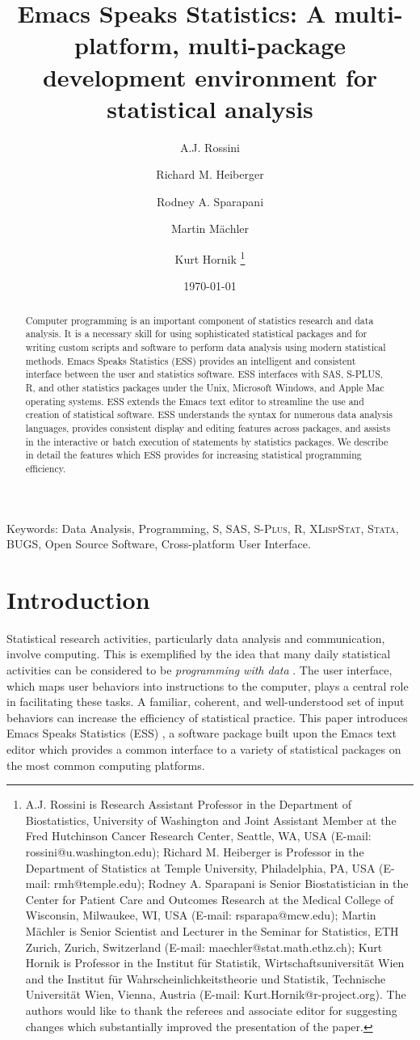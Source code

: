 \documentclass{article}
\title{Emacs Speaks Statistics: A multi-platform, multi-package
  development environment for statistical analysis}
\author{A.J. Rossini \and Richard M. Heiberger \and Rodney A. Sparapani
\and Martin M{\"a}chler \and Kurt Hornik \footnote{%
    A.J. Rossini is Research Assistant Professor in the Department of
    Biostatistics, University of Washington and Joint Assistant Member at
    the Fred Hutchinson Cancer Research Center, Seattle, WA, USA
    (E-mail: rossini@u.washington.edu);
    Richard M. Heiberger is Professor in the Department of Statistics at
    Temple University, Philadelphia, PA, USA (E-mail: rmh@temple.edu);
    Rodney A. Sparapani is Senior Biostatistician in the Center for Patient
    Care and Outcomes Research at the Medical College of Wisconsin,
    Milwaukee, WI, USA (E-mail: rsparapa@mcw.edu);
    Martin M{\"a}chler is Senior Scientist and Lecturer in the Seminar for
    Statistics, ETH Zurich, Zurich, Switzerland
    (E-mail: maechler@stat.math.ethz.ch);
    Kurt Hornik is Professor in the Institut f{\"u}r Statistik,
    Wirtschaftsuniversit{\"a}t Wien and the Institut f{\"u}r
    Wahrscheinlichkeitstheorie und Statistik, Technische
    Universit{\"a}t Wien, Vienna, Austria (E-mail:
    Kurt.Hornik@r-project.org).  The authors would like to thank the
    referees and associate editor for suggesting changes which
    substantially improved the presentation of the paper.}}
\date{\today}
\newif\ifdraft
\renewcommand{\baselinestretch}{1.5}
\newcommand*{\SAS}{\textsc{SAS}}
\newcommand*{\Splus}{\textsc{S-Plus}}
\newcommand*{\XLispStat}{\textsc{XLispStat}}
\newcommand*{\Stata}{\textsc{Stata}}
\begin{document}

\ifdraft
\setcounter{page}{0}
\tableofcontents
\fi

\maketitle

\ifdraft{}%
\else%
 \renewcommand{\baselinestretch}{1.5}
\fi

\begin{abstract}
  Computer programming is an important component of statistics
  research and data analysis.  It is a necessary skill for using
  sophisticated statistical packages and for writing custom scripts
  and software to perform data analysis using modern statistical
  methods.  Emacs Speaks Statistics (ESS) provides an intelligent and
  consistent interface between the user and statistics software.  ESS
  interfaces with SAS, S-PLUS, R, and other statistics packages under
  the Unix, Microsoft Windows, and Apple Mac operating systems.  ESS
  extends the Emacs text editor to streamline the use and creation of
  statistical software.  ESS understands the syntax for numerous data
  analysis languages, provides consistent display and editing features
  across packages, and assists in the interactive or batch execution
  of statements by statistics packages.  We describe in detail the
  features which ESS provides for increasing statistical programming
  efficiency.
\end{abstract}

\noindent Keywords: Data Analysis, Programming, S, \SAS, \Splus, R,
\XLispStat, \Stata, BUGS, Open Source Software, Cross-platform User
Interface.

\section{Introduction}
\label{sec:introduction}

Statistical research activities, particularly data analysis and
communication, involve computing.  This is exemplified by the idea
that many daily statistical activities can be considered to be
\textit{programming with data} \citep{ChaJ98}.  The user interface,
which maps user behaviors into instructions to the computer, plays a central
role in facilitating these tasks.  A familiar, coherent, and
well-understood set of input behaviors can increase the efficiency of
statistical practice.  This paper introduces Emacs Speaks Statistics
(ESS) \citep{ESS}, a software package built upon the Emacs text editor
which provides a common interface to a variety of statistical packages
on the most common computing platforms.
\end{document}
